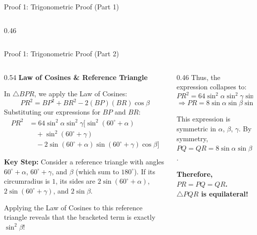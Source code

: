 \documentclass[aspectratio=169,10pt]{beamer}
\begin{document}
\begin{frame}{Proof 1: Trigonometric Proof (Part 1)}
\begin{columns}[T]
\begin{column}{0.46\textwidth}

\end{column}
\end{columns}
\end{frame}

\begin{frame}{Proof 1: Trigonometric Proof (Part 2)}
\begin{columns}[T]
\begin{column}{0.54\textwidth}
\small
\textbf{Law of Cosines \& Reference Triangle}

In $\triangle BPR$, we apply the Law of Cosines:
\[ PR^2 = BP^2 + BR^2 - 2(BP)(BR)\cos\beta \]
Substituting our expressions for $BP$ and $BR$:
\begin{align*}
PR^2 &= 64\sin^2\alpha\sin^2\gamma \big[ \sin^2(60^\circ+\alpha) \\
     &\quad + \sin^2(60^\circ+\gamma) \\
     &\quad - 2\sin(60^\circ+\alpha)\sin(60^\circ+\gamma)\cos\beta \big]
\end{align*}

\textbf{Key Step:} Consider a reference triangle with angles $60^\circ+\alpha$, $60^\circ+\gamma$, and $\beta$ (which sum to $180^\circ$). 
If its circumradius is $1$, its sides are $2\sin(60^\circ+\alpha)$, $2\sin(60^\circ+\gamma)$, and $2\sin\beta$.

Applying the Law of Cosines to this reference triangle reveals that the bracketed term is exactly $\sin^2\beta$!
\end{column}
\begin{column}{0.46\textwidth}
\small
Thus, the expression collapses to:
\[ PR^2 = 64\sin^2\alpha\sin^2\gamma\sin^2\beta \]
\[ \Rightarrow PR = 8\sin\alpha\sin\beta\sin\gamma \]

This expression is symmetric in $\alpha$, $\beta$, $\gamma$. By symmetry, $PQ = QR = 8\sin\alpha\sin\beta\sin\gamma$.

\begin{center}
\textcolor{morleymain}{\textbf{Therefore, $PR = PQ = QR$.}} \\
\textcolor{morleyaccent}{\textbf{$\triangle PQR$ is equilateral!}}
\end{center}


\end{column}
\end{columns}
\end{frame}
\end{document}
